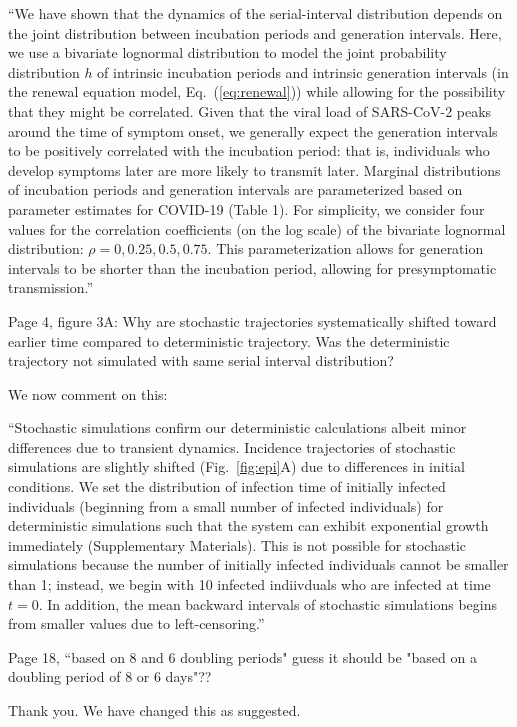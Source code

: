 \documentclass[12pt]{article}
\newcommand{\eref}[1]{Eq.~(\ref{eq:#1})}
\newcommand{\fref}[1]{Fig.~\ref{fig:#1}}
\newcommand{\revtext}{\textsf}
\begin{document}
``We have shown that the dynamics of the serial-interval distribution depends on the joint distribution between incubation periods and generation intervals.
Here, we use a bivariate lognormal distribution to model the joint probability distribution $h$ of intrinsic incubation periods and intrinsic generation intervals (in the renewal equation model, \eref{renewal}) while allowing for the possibility that they might be correlated.
Given that the viral load of SARS-CoV-2 peaks around the time of symptom onset, we generally expect the generation intervals to be positively correlated with the incubation period:
that is, individuals who develop symptoms later are more likely to transmit later.
Marginal distributions of incubation periods and generation intervals are parameterized based on parameter estimates for COVID-19 (Table 1).
For simplicity, we consider four values for the correlation coefficients (on the log scale) of the bivariate lognormal distribution: $\rho = 0, 0.25, 0.5, 0.75$.
This parameterization allows for generation intervals to be shorter than the incubation period, allowing for presymptomatic transmission.''

\revtext{Page 4, figure 3A: Why are stochastic trajectories systematically shifted toward earlier time compared to deterministic trajectory. Was the deterministic trajectory not simulated with same serial interval distribution?}

We now comment on this:

``Stochastic simulations confirm our deterministic calculations albeit minor differences due to transient dynamics.
Incidence trajectories of stochastic simulations are slightly shifted (\fref{epi}A) due to differences in initial conditions. 
We set the distribution of infection time of initially infected individuals (beginning from a small number of infected individuals) for deterministic simulations such that the system can exhibit exponential growth immediately (Supplementary Materials).
This is not possible for stochastic simulations because the number of initially infected individuals cannot be smaller than 1; instead, we begin with 10 infected indiivduals who are infected at time $t=0$.
In addition, the mean backward intervals of stochastic simulations begins from smaller values due to left-censoring.''

\revtext{Page 18, ``based on 8 and 6 doubling periods" guess it should be "based on a doubling period of 8 or 6 days"??}

Thank you. We have changed this as suggested.
\end{document}
